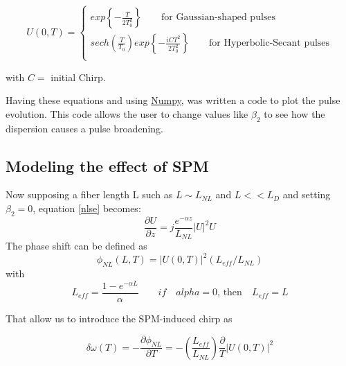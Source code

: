         
        \begin{equation}
                U(0,T) = 
                \begin{cases}
                    exp \left\{ -\frac{T}{2T^2_0} \right\} \qquad \text{for Gaussian-shaped pulses}  \\
                    sech\left( \frac{T}{T_0}\right) exp \left\{ -\frac{iCT^2}{2T^2_0} \right\} \qquad \text{for Hyperbolic-Secant pulses}  \\
                \end{cases}
            \end{equation}
            \begin{center}
                with $C =$  initial Chirp.
            \end{center}
            Having these equations and using \href{https://numpy.org/}{Numpy}, was written a code to plot the pulse evolution. This code allows the user to change values like $\beta_2$ to see how the dispersion causes a pulse broadening.
        
        
        \subsection{Modeling the effect of SPM}
        
        Now supposing a fiber length L such as $L \sim L_{NL}$ and $L << L_D$ and setting $\beta_2 = 0$, equation \eqref{nlse} becomes: 
            \begin{equation}
                \frac{\partial U}{\partial z} = j\frac{e^{-\alpha z}}{L_{NL}}|U|^2 U
            \end{equation}
            The phase shift can be defined as 
            \begin{equation}
                \phi_{NL}(L,T) = |U(0,T)|^2 (L_{eff}/L_{NL})
            \end{equation}
            with 
            \begin{equation}
                L_{eff} = \frac{1-e^{-\alpha L}}{\alpha}
                \qquad if \quad alpha = 0 \text{, then} \quad L_{eff} = L
            \end{equation}
            
            That allow us to introduce the SPM-induced chirp as
            
            \begin{equation}
                \delta \omega(T) = -\frac{\partial \phi_{NL}}{\partial T} = -\left( \frac{L_{eff}}{L_{NL}} \right) \frac{\partial }{T} |U(0,T)|^2
                \label{deltaomega}
            \end{equation}
        
